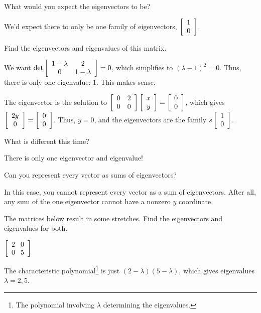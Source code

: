 \documentclass[../key.tex]{subfiles}
\begin{document}
\begin{inner_problem}
\item What would you expect the eigenvectors to be?
\end{inner_problem}

We'd expect there to only be one family of eigenvectors, $\left[\begin{array}{c} 1 \\ 0 \end{array}\right]$.

\begin{inner_problem}
\item Find the eigenvectors and eigenvalues of this matrix.
\end{inner_problem}

We want $\det \left[\begin{array}{cc} 1-\lambda & 2 \\ 0 & 1-\lambda \end{array}\right]=0$, which simplifies to $(\lambda -1)^2 = 0$. Thus, there is only one eigenvalue: $1$. This makes sense.

The eigenvector is the solution to $\left[\begin{array}{cc} 0 & 2 \\ 0 & 0 \end{array}\right]\left[\begin{array}{c} x \\ y \end{array}\right] = \left[\begin{array}{c} 0 \\ 0 \end{array}\right]$, which gives $\left[\begin{array}{c} 2y \\ 0 \end{array}\right]=\left[\begin{array}{c} 0 \\ 0 \end{array}\right]$. Thus, $y=0$, and the eigenvectors are the family $s\left[\begin{array}{c} 1 \\ 0 \end{array}\right]$.

\begin{inner_problem}
\item What is different this time?
\end{inner_problem}

There is only one eigenvector and eigenvalue!

\begin{inner_problem}
\item Can you represent every vector as sums of eigenvectors?
\end{inner_problem}

In this case, you cannot represent every vector as a sum of eigenvectors. After all, any sum of the one eigenvector cannot have a nonzero $y$ coordinate.

\begin{outer_problem}
\item The matrices below result in some stretches. Find the eigenvectors and eigenvalues for both.
\end{outer_problem}

\begin{inner_problem}[start=1]
\item $\left[\begin{smallmatrix} 2 & 0 \\ 0 & 5 \end{smallmatrix}\right]$
\end{inner_problem}

The characteristic polynomial\footnote{The polynomial involving $\lambda$ determining the eigenvalues.} is just $(2-\lambda)(5-\lambda)$, which gives eigenvalues $\lambda=2,5$.
\end{document}
